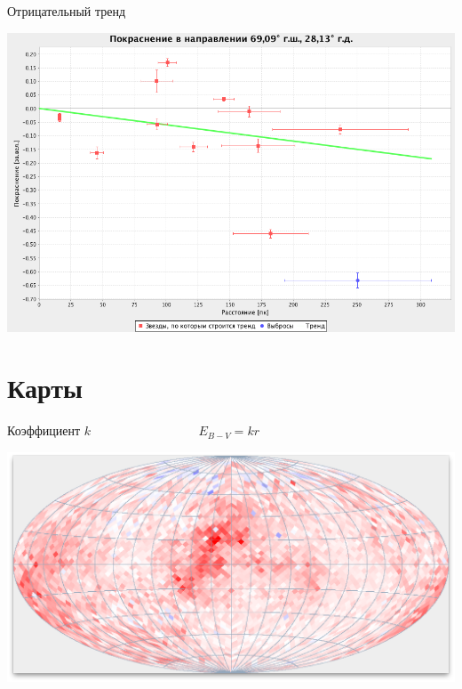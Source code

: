 \documentclass[14pt, fleqn, xcolor={dvipsnames, table}]{beamer}
\begin{document}
        \begin{frame}{Отрицательный тренд}
            \begin{center}
                \includegraphics[scale=0.35]{real-4-k.png}
            \end{center}             
        \end{frame}
        
    \section{Карты}            
        
        \begin{frame}{Коэффициент $k$ ~~~~~~~~~~~~~~~~ $E_{B - V} = k r$}
            \begin{center}
                \includegraphics[scale=0.32]{map-k.png}
            \end{center}             
        \end{frame}
        
\end{document}
